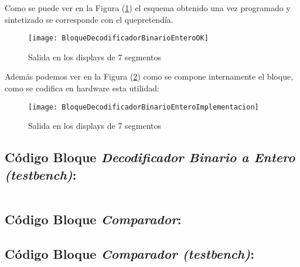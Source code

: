     Como se puede ver en la Figura (\ref{fig:BloqueDecodificadorBinarioEnteroOK}) el esquema obtenido una vez programado y sintetizado se corresponde con el quepretendía.
    \begin{figure}[H]
		    \centering
		    \texttt{[image: BloqueDecodificadorBinarioEnteroOK]}
		    \caption{Salida en los displays de 7 segmentos}
		    \label{fig:BloqueDecodificadorBinarioEnteroOK}
	\end{figure}
    Además podemos ver en la Figura (\ref{fig:BloqueDecodificadorBinarioEnteroImplementacion}) como se compone internamente el bloque, como se codifica en hardware esta utilidad:
    \begin{figure}[H]
		    \centering
		    \texttt{[image: BloqueDecodificadorBinarioEnteroImplementacion]}
		    \caption{Salida en los displays de 7 segmentos}
		    \label{fig:BloqueDecodificadorBinarioEnteroImplementacion}
	\end{figure}
    
\subsection{Código Bloque \textit{Decodificador Binario a Entero (testbench)}:} \label{code:DecodificadorBinarioEntero_tb}
    \inputminted[frame=lines,fontsize=\footnotesize,linenos]{vhdl}{CodeFiles/DecodificadorBinarioEntero_tb.vhd}
\subsection{Código Bloque \textit{Comparador}:} \label{code:Comparador}

\subsection{Código Bloque \textit{Comparador (testbench)}:} \label{code:Comparador_tb}
